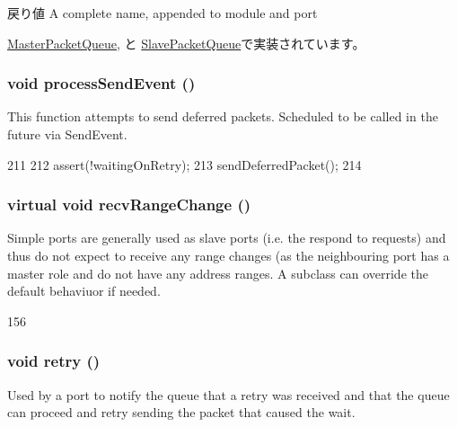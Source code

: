 \begin{DoxyReturn}{戻り値}
A complete name, appended to module and port 
\end{DoxyReturn}


\hyperlink{classMasterPacketQueue_a6490f765a824ced1cc94979609fe7e07}{MasterPacketQueue}, と \hyperlink{classSlavePacketQueue_a6490f765a824ced1cc94979609fe7e07}{SlavePacketQueue}で実装されています。\hypertarget{classPacketQueue_a09299dd6109496c23923f9e4f45b6f89}{
\subsubsection[{processSendEvent}]{\setlength{\rightskip}{0pt plus 5cm}void processSendEvent ()}}
\label{classPacketQueue_a09299dd6109496c23923f9e4f45b6f89}
This function attempts to send deferred packets. Scheduled to be called in the future via SendEvent. 


\begin{DoxyCode}
211 {
212     assert(!waitingOnRetry);
213     sendDeferredPacket();
214 }
\end{DoxyCode}
\hypertarget{classPacketQueue_af60d9c2c17fb4c9ebc5384a7e0c9f289}{
\subsubsection[{recvRangeChange}]{\setlength{\rightskip}{0pt plus 5cm}virtual void recvRangeChange ()}}
\label{classPacketQueue_af60d9c2c17fb4c9ebc5384a7e0c9f289}
Simple ports are generally used as slave ports (i.e. the respond to requests) and thus do not expect to receive any range changes (as the neighbouring port has a master role and do not have any address ranges. A subclass can override the default behaviuor if needed. 


\begin{DoxyCode}
156 { }
\end{DoxyCode}
\hypertarget{classPacketQueue_a549fc33ae3e5c345795b8384a91fb544}{
\subsubsection[{retry}]{\setlength{\rightskip}{0pt plus 5cm}void retry ()}}
\label{classPacketQueue_a549fc33ae3e5c345795b8384a91fb544}
Used by a port to notify the queue that a retry was received and that the queue can proceed and retry sending the packet that caused the wait. 


